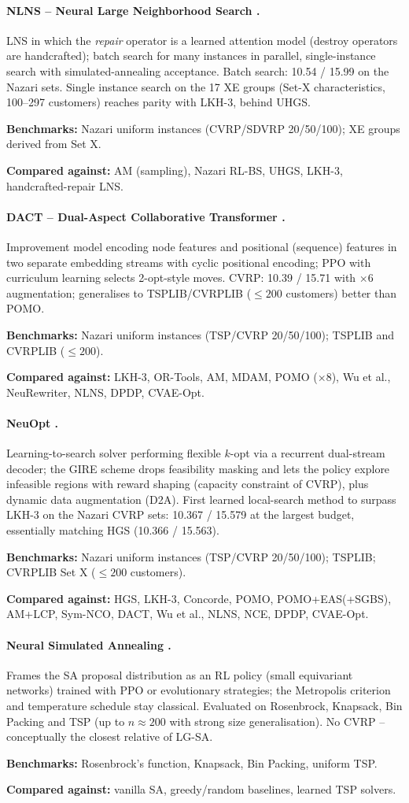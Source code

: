 \documentclass[11pt]{article}
\newcommand{\benchline}[1]{\par\smallskip\noindent\textbf{Benchmarks:} #1}
\newcommand{\baseline}[1]{\par\noindent\textbf{Compared against:} #1}
\begin{document}
\paragraph{NLNS -- Neural Large Neighborhood Search \citep{hottung_andre_neural_2020}.}
LNS in which the \emph{repair} operator is a learned attention model (destroy operators
are handcrafted); batch search for many instances in parallel, single-instance search with
simulated-annealing acceptance. Batch search: 10.54 / 15.99 on the Nazari sets. Single
instance search on the 17 XE groups (Set-X characteristics, 100--297 customers) reaches
parity with LKH-3, behind UHGS.
\benchline{Nazari uniform instances (CVRP/SDVRP 20/50/100); XE groups derived from Set X.}
\baseline{AM (sampling), Nazari RL-BS, UHGS, LKH-3, handcrafted-repair LNS.}

\paragraph{DACT -- Dual-Aspect Collaborative Transformer \citep{ma_learning_2022}.}
Improvement model encoding node features and positional (sequence) features in two
separate embedding streams with cyclic positional encoding; PPO with curriculum learning
selects 2-opt-style moves. CVRP: 10.39 / 15.71 with $\times 6$ augmentation; generalises
to TSPLIB/CVRPLIB ($\le 200$ customers) better than POMO.
\benchline{Nazari uniform instances (TSP/CVRP 20/50/100); TSPLIB and CVRPLIB
($\le 200$).}
\baseline{LKH-3, OR-Tools, AM, MDAM, POMO ($\times 8$), Wu et al., NeuRewriter, NLNS,
DPDP, CVAE-Opt.}

\paragraph{NeuOpt \citep{ma_learning_2023}.}
Learning-to-search solver performing flexible $k$-opt via a recurrent dual-stream decoder;
the GIRE scheme drops feasibility masking and lets the policy explore infeasible regions
with reward shaping (capacity constraint of CVRP), plus dynamic data augmentation (D2A).
First learned local-search method to surpass LKH-3 on the Nazari CVRP sets: 10.367 /
15.579 at the largest budget, essentially matching HGS (10.366 / 15.563).
\benchline{Nazari uniform instances (TSP/CVRP 20/50/100); TSPLIB; CVRPLIB Set X
($\le 200$ customers).}
\baseline{HGS, LKH-3, Concorde, POMO, POMO+EAS(+SGBS), AM+LCP, Sym-NCO, DACT, Wu et
al., NLNS, NCE, DPDP, CVAE-Opt.}

\paragraph{Neural Simulated Annealing \citep{correia_neural_2022}.}
Frames the SA proposal distribution as an RL policy (small equivariant networks) trained
with PPO or evolutionary strategies; the Metropolis criterion and temperature schedule
stay classical. Evaluated on Rosenbrock, Knapsack, Bin Packing and TSP (up to
$n\approx200$ with strong size generalisation). No CVRP -- conceptually the closest
relative of LG-SA.
\benchline{Rosenbrock's function, Knapsack, Bin Packing, uniform TSP.}
\baseline{vanilla SA, greedy/random baselines, learned TSP solvers.}
\end{document}
